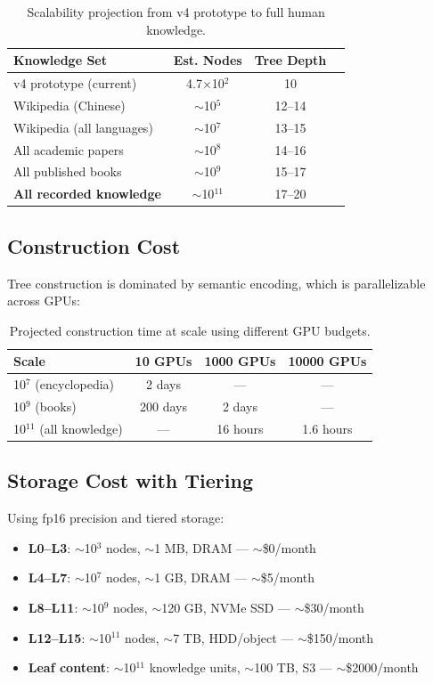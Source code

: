 \documentclass[11pt,a4paper]{article}
\begin{document}
\begin{table}[H]
\centering
\caption{Scalability projection from v4 prototype to full human knowledge.}
\label{tab:scale}
\begin{tabular}{lccc}
\toprule
\textbf{Knowledge Set} & \textbf{Est. Nodes} & \textbf{Tree Depth} \\
\midrule
v4 prototype (current) & 4.7$\times$10$^2$ & 10 \\
Wikipedia (Chinese) & $\sim$10$^5$ & 12--14 \\
Wikipedia (all languages) & $\sim$10$^7$ & 13--15 \\
All academic papers & $\sim$10$^8$ & 14--16 \\
All published books & $\sim$10$^9$ & 15--17 \\
\textbf{All recorded knowledge} & $\sim$10$^{11}$ & 17--20 \\
\bottomrule
\end{tabular}
\end{table}

\subsection{Construction Cost}

Tree construction is dominated by semantic encoding, which is parallelizable across GPUs:

\begin{table}[H]
\centering
\caption{Projected construction time at scale using different GPU budgets.}
\label{tab:construction}
\begin{tabular}{lccc}
\toprule
\textbf{Scale} & \textbf{10 GPUs} & \textbf{1000 GPUs} & \textbf{10000 GPUs} \\
\midrule
10$^7$ (encyclopedia) & 2 days & --- & --- \\
10$^9$ (books) & 200 days & 2 days & --- \\
10$^{11}$ (all knowledge) & --- & 16 hours & 1.6 hours \\
\bottomrule
\end{tabular}
\end{table}

\subsection{Storage Cost with Tiering}

Using fp16 precision and tiered storage:

\begin{itemize}
    \item \textbf{L0--L3}: $\sim$10$^3$ nodes, $\sim$1 MB, DRAM --- $\sim$\$0/month
    \item \textbf{L4--L7}: $\sim$10$^7$ nodes, $\sim$1 GB, DRAM --- $\sim$\$5/month
    \item \textbf{L8--L11}: $\sim$10$^9$ nodes, $\sim$120 GB, NVMe SSD --- $\sim$\$30/month
    \item \textbf{L12--L15}: $\sim$10$^{11}$ nodes, $\sim$7 TB, HDD/object --- $\sim$\$150/month
    \item \textbf{Leaf content}: $\sim$10$^{11}$ knowledge units, $\sim$100 TB, S3 --- $\sim$\$2000/month
\end{itemize}
\end{document}
